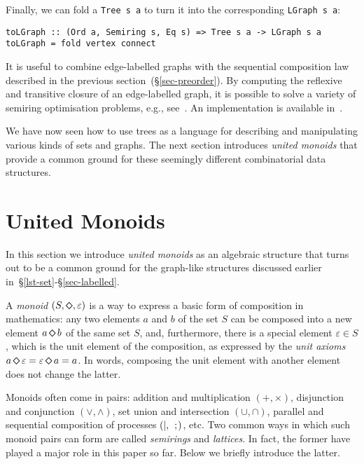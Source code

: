 \documentclass[crc,english]{programming}
\newcommand{\code}[1]{\lstinline[mathescape]|#1|}
\newcommand{\hcode}[1]{{\color{darkblue} \lstinline[keywordstyle={}]|#1|}} %
\newcommand{\dia}{\,\text{\raisebox{-0.3mm}{\Large $\diamond$}}\,}
\newcommand{\ldia}{\text{\raisebox{-0.3mm}{\Large $\diamond$}}}
\begin{document}
\noindent
Finally, we can fold a \hcode{Tree s a} to turn it into the corresponding
\hcode{LGraph s a}:

\begin{lstlisting}
toLGraph :: (Ord a, Semiring s, Eq s) => Tree s a -> LGraph s a
toLGraph = fold vertex connect
\end{lstlisting}

\noindent
It is useful to combine edge-labelled graphs with the sequential composition
law described in the previous section~(\S\ref{sec-preorder}). By computing the
reflexive and transitive closure of an edge-labelled graph, it is possible to
solve a variety of semiring optimisation problems, e.g.,
see~\cite{2013_semirings_dolan}\cite{mohri2002semiring}.
An implementation is available in~\cite{alga_haskell}.

We have now seen how to use trees as a language for describing and manipulating
various kinds of sets and graphs. The next section introduces \emph{united
monoids} that provide a common ground for these seemingly different
combinatorial data structures.

\section{United Monoids}\label{sec-united}

In this section we introduce \emph{united monoids} as an algebraic structure
that turns out to be a common ground for the graph-like structures
discussed earlier in~\S\ref{lst-set}-\S\ref{sec-labelled}.

A \emph{monoid} $(S, \ldia, \varepsilon)$ is a way to express a basic form of
composition in mathematics: any two elements $a$ and $b$ of the set $S$ can be
composed into a new element $a \dia b$ of the same set $S$, and, furthermore,
there is a special element $\varepsilon \in S$, which is the unit element of the
composition, as expressed by the \emph{unit axioms}
$a \dia \varepsilon = \varepsilon \dia a = a$. In words, composing the unit
element with another element does not change the latter.

Monoids often come in pairs: addition and multiplication $(+, \times)$,
disjunction and conjunction $(\vee, \wedge)$, set union and intersection
$(\cup, \cap)$, parallel and sequential composition of processes
$(\text{\code{|}},\ \text{\code{;}})$, etc. Two common ways in which such monoid
pairs can form are called \emph{semirings} and \emph{lattices}. In fact, the
former have played a major role in this paper so far. Below we briefly introduce
the latter.
\end{document}
